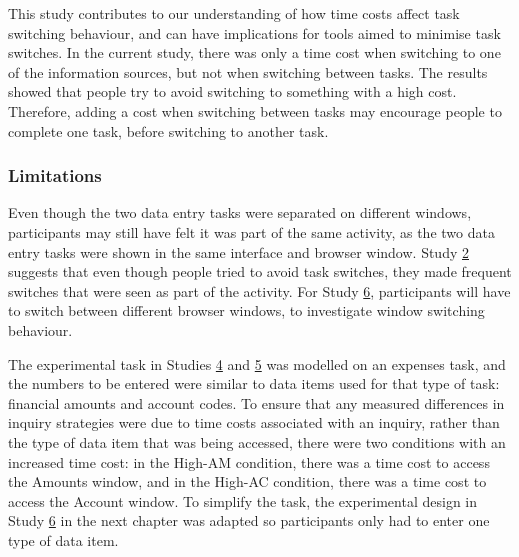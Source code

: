This study contributes to our understanding of how time costs affect task switching behaviour, and can have implications for tools aimed to minimise task switches. In the current study, there was only a time cost when switching to one of the information sources, but not when switching between tasks. The results showed that people try to avoid switching to something with a high cost. Therefore, adding a cost when switching between tasks may encourage people to complete one task, before switching to another task.

\subsubsection{Limitations}
Even though the two data entry tasks were separated on different windows, participants may still have felt it was part of the same activity, as the two data entry tasks were shown in the same interface and browser window. Study \hyperref[st:Study2]{2} suggests that even though people tried to avoid task switches, they  made frequent switches that were seen as part of the activity. For Study \hyperref[st:Study6]{6}, participants will have to switch between different browser windows, to investigate window switching behaviour. 

The experimental task in Studies \hyperref[st:Study4]{4} and \hyperref[st:Study5]{5} was modelled on an expenses task, and the numbers to be entered were similar to data items used for that type of task: financial amounts and account codes. To ensure that any measured differences in inquiry strategies were due to time costs associated with an inquiry, rather than the type of data item that was being accessed, there were two conditions with an increased time cost: in the High-AM condition, there was a time cost to access the Amounts window, and in the High-AC condition, there was a time cost to access the Account window. To simplify the task, the experimental design in Study \hyperref[st:Study6]{6} in the next chapter was adapted so participants only had to enter one type of data item. 

